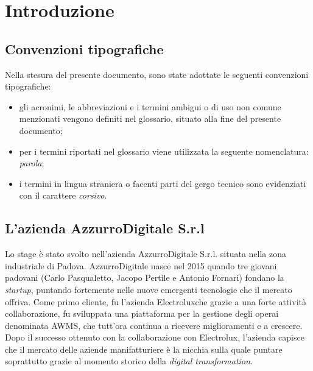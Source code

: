 
\chapter{Introduzione}
\label{cap:introduzione}

\section{Convenzioni tipografiche}
Nella stesura del presente documento, sono state adottate le seguenti convenzioni tipografiche:
\begin{itemize}
	\item gli acronimi, le abbreviazioni e i termini ambigui o di uso non comune menzionati vengono definiti nel glossario, situato alla fine del presente documento;
	\item per i termini riportati nel glossario viene utilizzata la seguente nomenclatura: \emph{parola}\glsfirstoccur;
	\item i termini in lingua straniera o facenti parti del gergo tecnico sono evidenziati con il carattere \emph{corsivo}.
\end{itemize}




\section{L'azienda AzzurroDigitale S.r.l}

Lo stage è stato svolto nell'azienda AzzurroDigitale S.r.l. situata nella zona industriale di Padova. AzzurroDigitale nasce nel 2015 quando tre giovani padovani (Carlo Pasqualetto, Jacopo Pertile e Antonio Fornari) fondano la \emph{startup}, puntando fortemente nelle nuove emergenti tecnologie che il mercato offriva. Come primo cliente, fu l'azienda \gls{Electrolux}\glsfirstoccur che grazie a una forte attività collaborazione, fu sviluppata una piattaforma per la gestione degli operai denominata \gls{AWMS}, che tutt’ora continua a ricevere miglioramenti e a crescere. Dopo il successo ottenuto con la collaborazione con \gls{Electrolux}\ap{[g]}, l'azienda capisce che il mercato delle aziende manifatturiere è la nicchia sulla quale puntare soprattutto grazie al momento storico della \emph{digital transformation}. 


